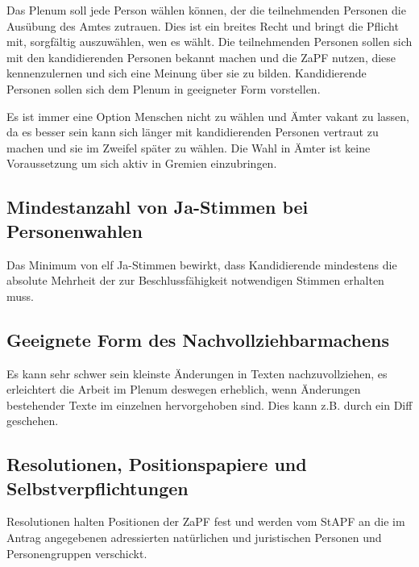 \documentclass[
  a4paper,
  oneside]{scrartcl}
\begin{document}
Das Plenum soll jede Person wählen können, der die teilnehmenden
Personen die Ausübung des Amtes zutrauen. Dies ist ein breites Recht und
bringt die Pflicht mit, sorgfältig auszuwählen, wen es wählt. Die
teilnehmenden Personen sollen sich mit den kandidierenden Personen
bekannt machen und die ZaPF nutzen, diese kennenzulernen und sich eine
Meinung über sie zu bilden. Kandidierende Personen sollen sich dem
Plenum in geeigneter Form vorstellen.

Es ist immer eine Option Menschen nicht zu wählen und Ämter vakant zu
lassen, da es besser sein kann sich länger mit kandidierenden Personen
vertraut zu machen und sie im Zweifel später zu wählen. Die Wahl in
Ämter ist keine Voraussetzung um sich aktiv in Gremien einzubringen.

\subsection*{Mindestanzahl von Ja-Stimmen bei
Personenwahlen}\label{mindestanzahl-von-ja-stimmen-bei-personenwahlen}

Das Minimum von elf Ja-Stimmen bewirkt, dass Kandidierende mindestens
die absolute Mehrheit der zur Beschlussfähigkeit notwendigen Stimmen
erhalten muss.

\subsection*{Geeignete Form des
Nachvollziehbarmachens}\label{geeignete-form-des-nachvollziehbarmachens}

Es kann sehr schwer sein kleinste Änderungen in Texten nachzuvollziehen,
es erleichtert die Arbeit im Plenum deswegen erheblich, wenn Änderungen
bestehender Texte im einzelnen hervorgehoben sind. Dies kann z.B. durch
ein Diff geschehen.

\subsection*{Resolutionen, Positionspapiere und
Selbstverpflichtungen}\label{resolutionen-positionspapiere-und-selbstverpflichtungen}

Resolutionen halten Positionen der ZaPF fest und werden vom StAPF an die
im Antrag angegebenen adressierten natürlichen und juristischen Personen
und Personengruppen verschickt.
\end{document}
